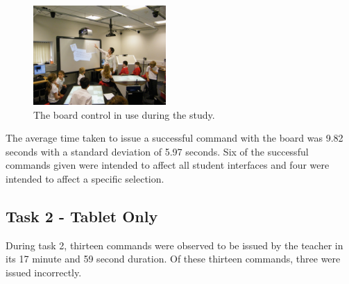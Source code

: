 \documentclass[manuscript, review, screen]{acmart}
\begin{document}
\begin{figure}[h]
   \centering
   \includegraphics[width=0.45\textwidth]{figures/new_study_board.png}
   \caption{The board control in use during the study.}
   \label{fig:studyBoard}
\end{figure}

The average time taken to issue a successful command with the board was 9.82 seconds with a standard deviation of 5.97 seconds.
Six of the successful commands given were intended to affect all student interfaces and four were intended to affect a specific selection.

\subsection{Task 2 - Tablet Only}
\label{sec:results:task2}  

During task 2, thirteen commands were observed to be issued by the teacher in its 17 minute and 59 second duration.
Of these thirteen commands, three were issued incorrectly.
\end{document}
